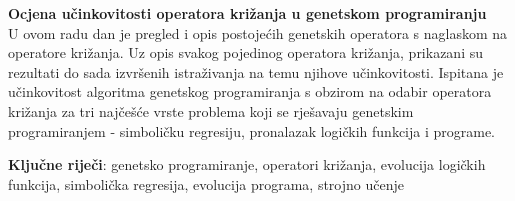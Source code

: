 \textbf{ \large Ocjena učinkovitosti operatora križanja u genetskom programiranju} \\

U ovom radu dan je pregled i opis postojećih genetskih operatora s naglaskom na operatore križanja. Uz opis svakog pojedinog operatora križanja, prikazani su rezultati do sada izvršenih istraživanja na temu njihove učinkovitosti. Ispitana je učinkovitost algoritma genetskog programiranja s obzirom na odabir operatora križanja za tri najčešće vrste problema koji se rješavaju genetskim programiranjem - simboličku regresiju, pronalazak logičkih funkcija i programe.

\textbf{Ključne riječi}: genetsko programiranje, operatori križanja, evolucija logičkih funkcija, simbolička regresija, evolucija programa, strojno učenje